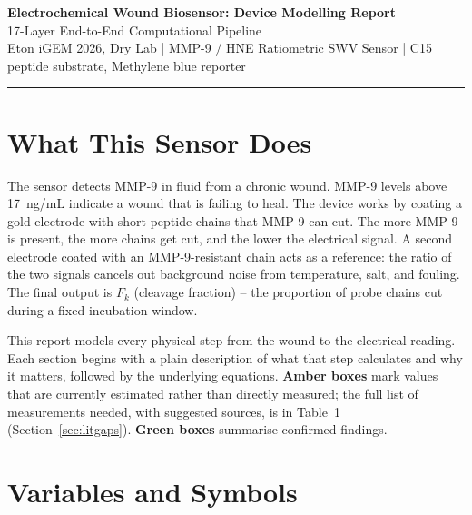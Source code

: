 \documentclass[10pt,a4paper]{article}
\begin{document}
\begin{center}
{\LARGE\bfseries Electrochemical Wound Biosensor: Device Modelling Report}\\[0.4em]
{\large 17-Layer End-to-End Computational Pipeline}\\[0.25em]
{\small\color{gray}Eton iGEM 2026, Dry Lab \quad|\quad
MMP-9 / HNE Ratiometric SWV Sensor \quad|\quad
C15 peptide substrate, Methylene blue reporter}
\end{center}
\vspace{0.4em}\hrule\vspace{0.7em}

\section{What This Sensor Does}

The sensor detects MMP-9 in fluid from a chronic wound. MMP-9 levels above 17~ng/mL indicate
a wound that is failing to heal. The device works by coating a gold electrode with short
peptide chains that MMP-9 can cut. The more MMP-9 is present, the more chains get cut, and
the lower the electrical signal. A second electrode coated with an MMP-9-resistant chain acts
as a reference: the ratio of the two signals cancels out background noise from temperature,
salt, and fouling. The final output is $F_k$ (cleavage fraction) -- the proportion of probe
chains cut during a fixed incubation window.

This report models every physical step from the wound to the electrical reading. Each section
begins with a plain description of what that step calculates and why it matters, followed by
the underlying equations. \colorbox{boxamber}{\textbf{\textcolor{ambertext}{Amber boxes}}}
mark values that are currently estimated rather than directly measured; the full list of
measurements needed, with suggested sources, is in Table~1 (Section~\ref{sec:litgaps}).
\colorbox{boxgreen}{\textbf{\textcolor{confgreen}{Green boxes}}} summarise confirmed findings.

\section{Variables and Symbols}
\end{document}
